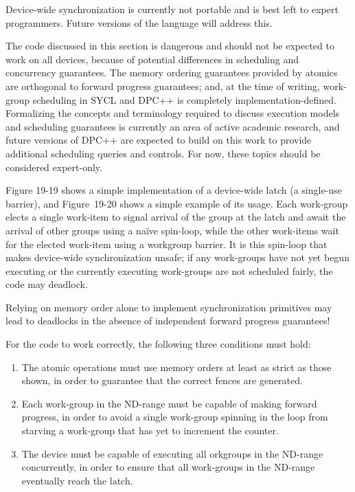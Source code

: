 \begin{tcolorbox}[colback=red!5!white,colframe=red!75!black]
Device-wide synchronization is currently not portable and is best left to expert programmers. Future versions of the language will address this.
\end{tcolorbox}

The code discussed in this section is dangerous and should not be expected to work on all devices, because of potential differences in scheduling and concurrency guarantees. The memory ordering guarantees provided by atomics are orthogonal to forward progress guarantees; and, at the time of writing, work-group scheduling in SYCL and DPC++ is completely implementation-defined. Formalizing the concepts and terminology required to discuss execution models and scheduling guarantees is currently an area of active academic research, and future versions of DPC++ are expected to build on this work to provide additional scheduling queries and controls. For now, these topics should be considered expert-only.\par

Figure 19-19 shows a simple implementation of a device-wide latch (a single-use barrier), and Figure 19-20 shows a simple example of its usage. Each work-group elects a single work-item to signal arrival of the group at the latch and await the arrival of other groups using a naïve spin-loop, while the other work-items wait for the elected work-item using a workgroup barrier. It is this spin-loop that makes device-wide synchronization unsafe; if any work-groups have not yet begun executing or the currently executing work-groups are not scheduled fairly, the code may deadlock.\par

\begin{tcolorbox}[colback=red!5!white,colframe=red!75!black]
Relying on memory order alone to implement synchronization primitives may lead to deadlocks in the absence of independent forward progress guarantees!
\end{tcolorbox}

For the code to work correctly, the following three conditions must hold:\par

\begin{enumerate}
	\item The atomic operations must use memory orders at least as strict as those shown, in order to guarantee that the correct fences are generated.
	\item Each work-group in the ND-range must be capable of making forward progress, in order to avoid a single work-group spinning in the loop from starving a work-group that has yet to increment the counter.
	\item The device must be capable of executing all orkgroups in the ND-range concurrently, in order to ensure that all work-groups in the ND-range eventually reach the latch.
\end{enumerate}

